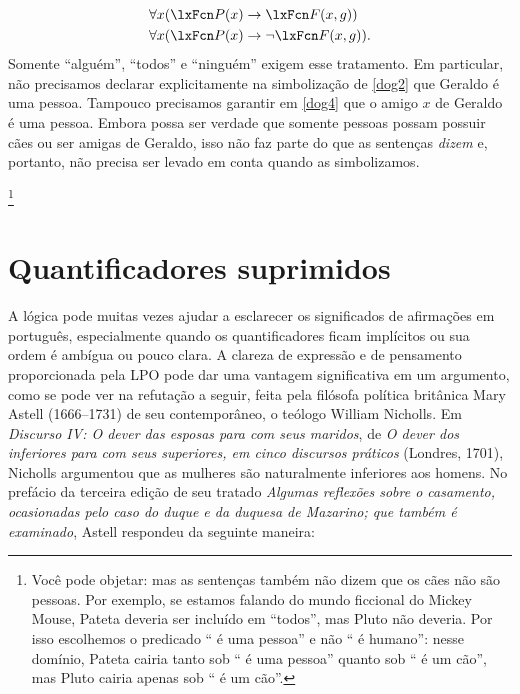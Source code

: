 \begin{align*}
	& \forall x(\atom{P}{x} \eif \atom{F}{x,g})\\
	& \forall x(\atom{P}{x} \eif \enot\atom{F}{x,g}).
\end{align*}
Somente \textquotedblleft alguém\textquotedblright{}, \textquotedblleft todos\textquotedblright{} e \textquotedblleft ninguém\textquotedblright{} exigem esse tratamento. Em particular, não precisamos declarar explicitamente na simbolização de
\cref{dog2} que Geraldo é uma pessoa. Tampouco precisamos
garantir em \cref{dog4} que o amigo $x$ de Geraldo é uma pessoa.
Embora possa ser verdade que somente pessoas possam possuir cães ou ser amigas
de Geraldo, isso não faz parte do que as sentenças \emph{dizem} e, portanto, não
precisa ser levado em conta quando as simbolizamos.

\footnote{Você pode objetar: mas as sentenças também não dizem que os cães não são pessoas. Por exemplo, se estamos falando do mundo ficcional do Mickey Mouse, Pateta deveria ser incluído em \textquotedblleft todos\textquotedblright{}, mas Pluto não deveria. Por isso escolhemos o predicado \textquotedblleft \blank{} é uma pessoa\textquotedblright{} e não \textquotedblleft \blank{} é humano\textquotedblright{}: nesse domínio, Pateta cairia tanto sob \textquotedblleft \blank{} é uma pessoa\textquotedblright{} quanto sob \textquotedblleft \blank{} é um cão\textquotedblright{}, mas Pluto cairia apenas sob \textquotedblleft \blank{} é um cão\textquotedblright{}.}







\section{Quantificadores suprimidos}\label{ss:SuppQuant}

A lógica pode muitas vezes ajudar a esclarecer os significados de afirmações em português, especialmente quando os quantificadores ficam implícitos ou sua ordem é ambígua ou pouco clara. A clareza de expressão e de pensamento proporcionada pela LPO pode dar uma vantagem significativa em um argumento, como se pode ver na refutação a seguir, feita pela filósofa política britânica Mary Astell (1666--1731) de seu contemporâneo, o teólogo William Nicholls. Em \textit{Discurso IV: O dever das esposas para com seus maridos}, de \textit{O dever dos inferiores para com seus superiores, em cinco discursos práticos} (Londres, 1701), Nicholls argumentou que as mulheres são naturalmente inferiores aos homens. No prefácio da terceira edição de seu tratado \textit{Algumas reflexões sobre o casamento, ocasionadas pelo caso do duque e da duquesa de Mazarino; que também é examinado}, Astell respondeu da seguinte maneira:












